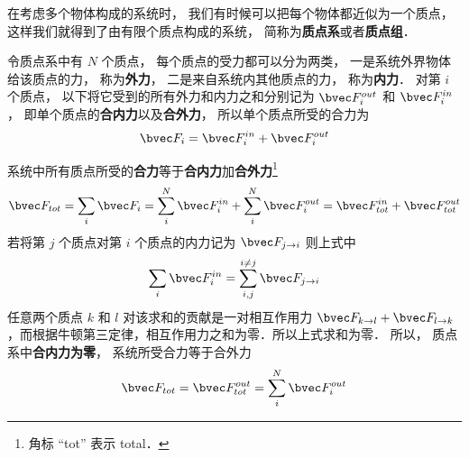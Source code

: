 

在考虑多个物体构成的系统时， 我们有时候可以把每个物体都近似为一个质点， 这样我们就得到了由有限个质点构成的系统， 简称为\textbf{质点系}或者\textbf{质点组}．

令质点系中有 $N$ 个质点， 每个质点的受力都可以分为两类， 一是系统外界物体给该质点的力， 称为\textbf{外力}， 二是来自系统内其他质点的力， 称为\textbf{内力}． 对第 $i$ 个质点， 以下将它受到的所有外力和内力之和分别记为 $\bvec F_i^{out}$ 和 $\bvec F_i^{in}$， 即单个质点的\textbf{合内力}以及\textbf{合外力}， 所以单个质点所受的合力为
\begin{equation}
\bvec F_i = \bvec F_i^{in} + \bvec F_i^{out}
\end{equation}

系统中所有质点所受的\textbf{合力}等于\textbf{合内力}加\textbf{合外力}\footnote{角标 “tot” 表示 total．}
\begin{equation}
\bvec F_{tot} = \sum_i \bvec F_i = \sum_i^N \bvec F_i^{in} + \sum_i^N \bvec F_i^{out} = \bvec F_{tot}^{in} + \bvec F_{tot}^{out}
\end{equation}
若将第 $j$ 个质点对第 $i$ 个质点的内力记为 $\bvec F_{j\to i}$ 则上式中
\begin{equation}
\sum_i \bvec F_i^{in} = \sum_{i,j}^{i \ne j} \bvec F_{j \to i}
\end{equation}
任意两个质点 $k$ 和 $l$ 对该求和的贡献是一对相互作用力 $\bvec F_{k \to l} + \bvec F_{l \to k}$，而根据牛顿第三定律，相互作用力之和为零．所以上式求和为零． 所以， 质点系中\textbf{合内力为零}， 系统所受合力等于合外力
\begin{equation}
\bvec F_{tot} = \bvec F_{tot}^{out} = \sum_i^N \bvec F_i^{out}
\end{equation}
